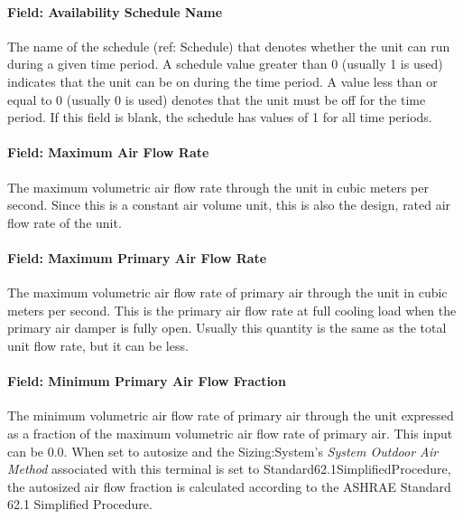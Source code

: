 \paragraph{Field: Availability Schedule Name}\label{field-availability-schedule-name-7}

The name of the schedule (ref: Schedule) that denotes whether the unit can run during a given time period. A schedule value greater than 0 (usually 1 is used) indicates that the unit can be on during the time period. A value less than or equal to 0 (usually 0 is used) denotes that the unit must be off for the time period. If this field is blank, the schedule has values of 1 for all time periods.

\paragraph{Field: Maximum Air Flow Rate}\label{field-maximum-air-flow-rate-6}

The maximum volumetric air flow rate through the unit in cubic meters per second. Since this is a constant air volume unit, this is also the design, rated air flow rate of the unit.

\paragraph{Field: Maximum Primary Air Flow Rate}\label{field-maximum-primary-air-flow-rate}

The maximum volumetric air flow rate of primary air through the unit in cubic meters per second. This is the primary air flow rate at full cooling load when the primary air damper is fully open. Usually this quantity is the same as the total unit flow rate, but it can be less.

\paragraph{Field: Minimum Primary Air Flow Fraction}\label{field-minimum-primary-air-flow-fraction}

The minimum volumetric air flow rate of primary air through the unit expressed as a fraction of the maximum volumetric air flow rate of primary air. This input can be 0.0. When set to autosize and the Sizing:System's \emph{System Outdoor Air Method} associated with this terminal is set to Standard62.1SimplifiedProcedure, the autosized air flow fraction is calculated according to the ASHRAE Standard 62.1 Simplified Procedure.

